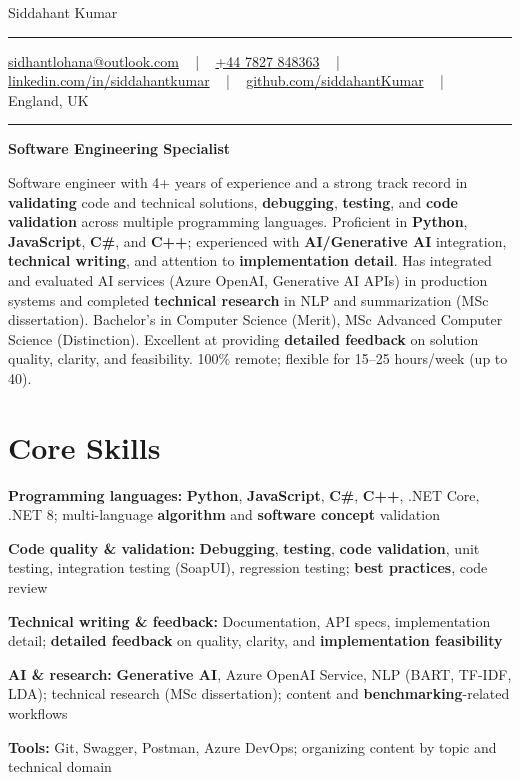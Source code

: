 \documentclass[letterpaper,10pt]{article}
\newcommand{\documentTitle}[2]{
  \begin{center}
    \vspace*{-0.3in}
    {\Huge\color{accentTitle} #1}
    \vspace{8pt}
    {\color{accentLine} \hrule}
    \vspace{2pt}
    \footnotesize{#2}
    \vspace{2pt}
    {\color{accentLine} \hrule}
  \end{center}
}
\newenvironment{resume_list}{
  \vspace{-7pt}
  \begin{itemize}[itemsep=-2px, parsep=1pt, leftmargin=30pt]
}{
  \end{itemize}
}
\begin{document}
\documentTitle{Siddahant Kumar}{
\vspace{0.1cm}
\href{mailto:sidhantlohana@outlook.com}{sidhantlohana@outlook.com} ~ | ~
\href{tel:+447827848363}{+44 7827 848363} ~ | ~
\href{https://www.linkedin.com/in/siddahantkumar/}{linkedin.com/in/siddahantkumar} ~ | ~
\href{https://github.com/siddahantKumar}{github.com/siddahantKumar} ~ | ~
England, UK
}

\begin{center}
\textbf{Software Engineering Specialist}
\end{center}

Software engineer with 4+ years of experience and a strong track record in \textbf{validating} code and technical solutions, \textbf{debugging}, \textbf{testing}, and \textbf{code validation} across multiple programming languages. Proficient in \textbf{Python}, \textbf{JavaScript}, \textbf{C\#}, and \textbf{C++}; experienced with \textbf{AI/Generative AI} integration, \textbf{technical writing}, and attention to \textbf{implementation detail}. Has integrated and evaluated AI services (Azure OpenAI, Generative AI APIs) in production systems and completed \textbf{technical research} in NLP and summarization (MSc dissertation). Bachelor's in Computer Science (Merit), MSc Advanced Computer Science (Distinction). Excellent at providing \textbf{detailed feedback} on solution quality, clarity, and feasibility. 100\% remote; flexible for 15--25 hours/week (up to 40).


\section{Core Skills}

\begin{resume_list}
    \item \textbf{Programming languages:} \textbf{Python}, \textbf{JavaScript}, \textbf{C\#}, \textbf{C++}, .NET Core, .NET 8; multi-language \textbf{algorithm} and \textbf{software concept} validation
    \item \textbf{Code quality \& validation:} \textbf{Debugging}, \textbf{testing}, \textbf{code validation}, unit testing, integration testing (SoapUI), regression testing; \textbf{best practices}, code review
    \item \textbf{Technical writing \& feedback:} Documentation, API specs, implementation detail; \textbf{detailed feedback} on quality, clarity, and \textbf{implementation feasibility}
    \item \textbf{AI \& research:} \textbf{Generative AI}, Azure OpenAI Service, NLP (BART, TF-IDF, LDA); technical research (MSc dissertation); content and \textbf{benchmarking}-related workflows
    \item \textbf{Tools:} Git, Swagger, Postman, Azure DevOps; organizing content by topic and technical domain
\end{resume_list}
\end{document}
